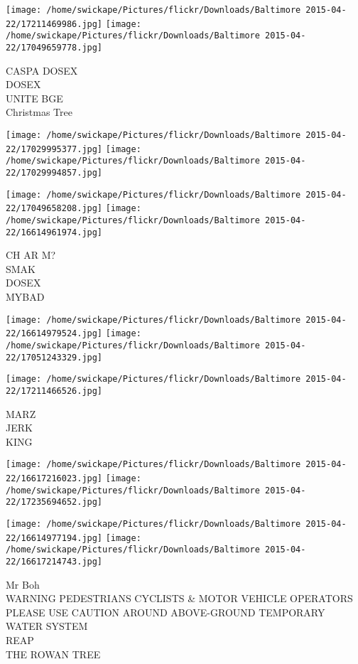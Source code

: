 \documentclass[10pt,letterpaper]{article}
\begin{document}
\texttt{[image: /home/swickape/Pictures/flickr/Downloads/Baltimore 2015-04-22/17211469986.jpg]}
\texttt{[image: /home/swickape/Pictures/flickr/Downloads/Baltimore 2015-04-22/17049659778.jpg]}

CASPA DOSEX\\
DOSEX\\
UNITE BGE\\
Christmas Tree
\pagebreak

\texttt{[image: /home/swickape/Pictures/flickr/Downloads/Baltimore 2015-04-22/17029995377.jpg]}
\texttt{[image: /home/swickape/Pictures/flickr/Downloads/Baltimore 2015-04-22/17029994857.jpg]}

\texttt{[image: /home/swickape/Pictures/flickr/Downloads/Baltimore 2015-04-22/17049658208.jpg]}
\texttt{[image: /home/swickape/Pictures/flickr/Downloads/Baltimore 2015-04-22/16614961974.jpg]}

CH AR M?\\
SMAK\\
DOSEX\\
MYBAD
\pagebreak

\texttt{[image: /home/swickape/Pictures/flickr/Downloads/Baltimore 2015-04-22/16614979524.jpg]}
\texttt{[image: /home/swickape/Pictures/flickr/Downloads/Baltimore 2015-04-22/17051243329.jpg]}

\vspace{0.25in}
\texttt{[image: /home/swickape/Pictures/flickr/Downloads/Baltimore 2015-04-22/17211466526.jpg]}

MARZ\\
JERK\\
KING
\pagebreak

\texttt{[image: /home/swickape/Pictures/flickr/Downloads/Baltimore 2015-04-22/16617216023.jpg]}
\texttt{[image: /home/swickape/Pictures/flickr/Downloads/Baltimore 2015-04-22/17235694652.jpg]}

\texttt{[image: /home/swickape/Pictures/flickr/Downloads/Baltimore 2015-04-22/16614977194.jpg]}
\texttt{[image: /home/swickape/Pictures/flickr/Downloads/Baltimore 2015-04-22/16617214743.jpg]}

Mr Boh\\
WARNING PEDESTRIANS CYCLISTS \& MOTOR VEHICLE OPERATORS PLEASE USE CAUTION AROUND ABOVE{-}GROUND TEMPORARY WATER SYSTEM\\
REAP\\
THE ROWAN TREE
\pagebreak
\end{document}

